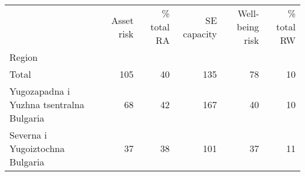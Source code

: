 \begin{tabular}{lrrrrr}
\toprule
{} &  Asset risk &  \% total RA &  SE capacity &  Well-being risk &  \% total RW \\
Region                                   &             &             &              &                  &             \\
\midrule
Total                                    &         105 &          40 &          135 &               78 &          10 \\
Yugozapadna i Yuzhna tsentralna Bulgaria &          68 &          42 &          167 &               40 &          10 \\
Severna i Yugoiztochna Bulgaria          &          37 &          38 &          101 &               37 &          11 \\
\bottomrule
\end{tabular}
